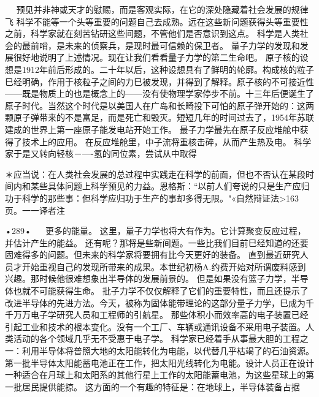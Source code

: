   
预见并非神或天才的慰赐，而是客观实际，在它的深处隐藏着社会发展的规律飞
科学不能等一个头等重要的问题自己去成熟。远在这些新问题获得头等重要性之前，科学家就在刻苦钻研这些间题，不管他们是否意识到这点。
科学是人类社会的最前哨，是未来的侦察兵，是现时最可信赖的保卫者。
量子力学的发现和发展很好地说明了上述情况。现在让我们看看量子力学的第二生命吧。
原子核的设想是1912年前后形成的。二十年以后，这种设想具有了鲜明的轮廓。构成核的粒子巳经明确，作用于核粒子之间的力巳被发现，并得到了解释。原子核的不可接近性——既是物质上的也是概念上的——没有使物理学家停步不前。十三年后便诞生了原子时代。当然这个时代是以美国人在广岛和长畸投下可怕的原子弹开始的：这两颗原子弹带来的不是富足，而是死亡和毁灭。短短几年的时间过去了，1954年苏联建成的世界上第一座原子能发电站开始工作。
最子力学最先在原子反应堆舱中获得了技术上的应用。
在反应堆舱里，中子流将重核击碎，从而产生热及电。
科学家于是又转向轻核－—-氢的同位素，尝试从中取得

＊应当说：在人类社会发展的总过程中实践走在科学的前面，但也不否认在某段时间内和某些具体问题上科学预见的力益。恩格斯：“以前人们夸说的只是生产应归功于科学的那些事：但科学应归功于生产的事却多得无限。"«自然辩证法>163页。一一译者注

•289•
  
更多的能量。
这里，量子力学也将大有作为。它计算聚变反应过程，并估计产生的能益。
还有呢？那将是些新间题。一些比我们目前巳经知道的还要固难得多的问题。但未来的科学家将要拥有比今天更好的装备。
直到最近研究人员才开始重视自己的发现所带来的成果。本世纪初杨A.约费开始对所谓废料感到兴趣。那时候他很难想象出半导体的发展前景的。
但是如果没有篮子力学，半导体也就不可能获得生命。
批子力学不仅仅解释了它们的重要特性，而且还提示了改进半导体的先进方法。今天，被称为固体能带理论的这部分量子力学，巳成为千千万万电子学研究人员和工程师的引航星。
那些体积小而效率高的电子装置已经引起工业和技术的根本变化。没有一个工厂、车辆或通讯设备不采用电子装置。人类活动的各个领域几乎无不受惠于电子学。
科学家已经着手从事最大胆的工程之一：利用半导体将普照大地的太阳能转化为电能，以代替几乎枯竭了的石油资源。第一批半导体太阳能蓄电池正在工作，把太阳光线转化为电能。设计人员正在设计一种适合在月球上和太阳系的其他行星上工作的太阳能蓄电池，为这些星球上的第一批居民提供能掠。
这方面的一个有趣的特征是：在地球上，半导体装备占据


